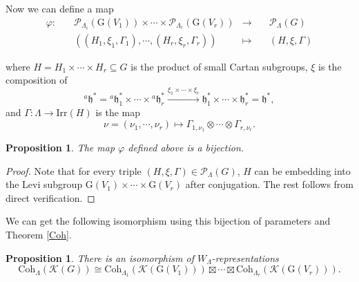 \documentclass[12pt, a4paper]{amsart}
\numberwithin{equation}{section}
\newtheorem{prop}[thm]{Proposition}
\newcommand{\CK}{{\mathcal {K}}}
\newcommand{\CP}{{\mathcal {P}}}
\newcommand{\fh}{\mathfrak{h}}
\newcommand{\G}{{\mathrm{G}}}
\newcommand{\Irr}{{\mathrm{Irr}}}
\newcommand{\defmap}[5]{
           \begin{equation*}
              \begin{aligned}
                   #1:\quad  & #2 &\longrightarrow &\quad #3 \\
                      \quad  & #4    &\longmapsto  &\quad #5
              \end{aligned}
           \end{equation*}
          }
\begin{document}
Now we can define a map \defmap{\varphi}{\CP_{\Lambda_i}(\G(V_1)) \times \cdots \times \CP_{\Lambda_r}(\G(V_r))}{\CP_{\Lambda}(G)}{((H_1,\xi_1,\Gamma_1),\cdots,(H_r,\xi_r,\Gamma_r))}{(H,\xi,\Gamma)}
where $H = H_1 \times \cdots \times H_r \subseteq G$ is the product of small Cartan subgroups, $\xi$ is the composition of
\[
    ^{a}\fh^*={^{a}\fh}_1^*\times \cdots \times  {^{a}\fh}_{r}^* \xrightarrow{\xi_1 \times \cdots \times \xi_r} \fh_1^* \times \cdots \times \fh_r^* = \fh^*,
\]
and $\Gamma: \Lambda \to \Irr(H)$ is the map
$$\nu = (\nu_1,\cdots ,\nu_r) \mapsto \Gamma_{1,\nu_1} \otimes \cdots \otimes \Gamma_{r,\nu_r}.$$



\begin{prop}\label{varphi bij}
    The map $\varphi$ defined above is a bijection.
\end{prop}

\begin{proof}
    Note that for every triple $(H,\xi,\Gamma) \in \mathscr{P}_{\Lambda}(G)$, $H$ can be embedding into the Levi subgroup $\G(V_1) \times \cdots \times \G(V_r)$ after conjugation. The rest follows from direct verification.
\end{proof}

We can get the following isomorphism using this bijection of parameters and Theorem \ref{Coh}.

\begin{prop}\label{Coh cong}
    There is an isomorphism of $W_{\Lambda}$-representations
    \begin{equation}
        \mathrm{Coh}_{\Lambda}(\CK(G)) \cong \mathrm{Coh}_{\Lambda_1}(\CK(\G(V_1))) \boxtimes \cdots \boxtimes \mathrm{Coh}_{\Lambda_r}(\CK(\G(V_r))).
    \end{equation}
\end{prop}
\end{document}
